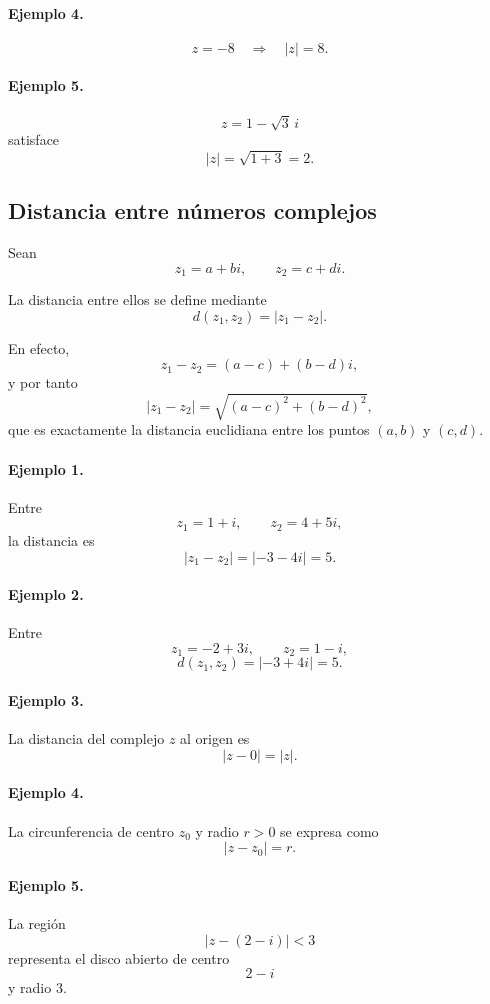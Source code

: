 \paragraph{Ejemplo 4.}
\[
z=-8
\quad\Longrightarrow\quad
|z|=8.
\]

\paragraph{Ejemplo 5.}
\[
z=1-\sqrt3\,i
\]
satisface
\[
|z|
=
\sqrt{1+3}
=
2.
\]

\subsection{Distancia entre números complejos}

Sean
\[
z_1=a+bi,
\qquad
z_2=c+di.
\]

La distancia entre ellos se define mediante
\[
\boxed{
d(z_1,z_2)=|z_1-z_2|.
}
\]

En efecto,
\[
z_1-z_2
=
(a-c)+(b-d)i,
\]
y por tanto
\[
|z_1-z_2|
=
\sqrt{(a-c)^2+(b-d)^2},
\]
que es exactamente la distancia euclidiana entre los puntos $(a,b)$ y $(c,d)$.

\paragraph{Ejemplo 1.}
Entre
\[
z_1=1+i,
\qquad
z_2=4+5i,
\]
la distancia es
\[
|z_1-z_2|
=
|-3-4i|
=
5.
\]

\paragraph{Ejemplo 2.}
Entre
\[
z_1=-2+3i,
\qquad
z_2=1-i,
\]
\[
d(z_1,z_2)
=
|-3+4i|
=
5.
\]

\paragraph{Ejemplo 3.}
La distancia del complejo $z$ al origen es
\[
|z-0|=|z|.
\]

\paragraph{Ejemplo 4.}
La circunferencia de centro $z_0$ y radio $r>0$ se expresa como
\[
\boxed{|z-z_0|=r.}
\]

\paragraph{Ejemplo 5.}
La región
\[
|z-(2-i)|<3
\]
representa el disco abierto de centro
\[
2-i
\]
y radio $3$.

